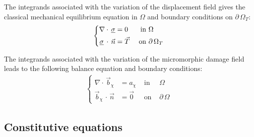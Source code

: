 The integrands associated with the variation of the displacement field gives
the classical mechanical equilibrium equation in \(\Omega\) and boundary
conditions on \(\partial\,\Omega_{T}\):
\begin{equation}
  \label{eq:micromorphicdamage:mechanical_equilibrium}
  \begin{aligned}
    \left\{
    \begin{aligned}
    \nabla \cdot\,\underline{\sigma} &= 0       & \text{ in } & \Omega \\
    \underline{\sigma}\,\cdot\,\vec{n}&=\vec{T} & \text{ on } & \partial\,\Omega_{T}
    \end{aligned}
    \right.
  \end{aligned}
\end{equation}

The integrands associated with the variation of the micromorphic damage field
leads to the following balance equation and boundary conditions:
\begin{equation}
  \label{eq:micromorphicdamage:d_chi}
  \begin{aligned}
    \left\{
    \begin{aligned}
    \nabla \cdot\,\vec{b}_{\chi} &= a_{\chi} &\text{ in }& \Omega \\
    \vec{b}_{\chi}\,\cdot\,\vec{n}&=\vec{0} &\text{ on }& \partial\,\Omega
    \end{aligned}
    \right.
  \end{aligned}
\end{equation}

\subsection{Constitutive equations}
\label{sec:micromorphicdamage:constitutive_equations}

